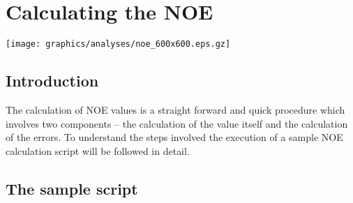 
\chapter{Calculating the NOE} \label{ch: NOE}


\begin{figure*}[h]
\texttt{[image: graphics/analyses/noe\_600x600.eps.gz]}
\end{figure*}



\section{Introduction}

The calculation of NOE values is a straight forward and quick procedure which involves two components -- the calculation of the value itself and the calculation of the errors.  To understand the steps involved the execution of a sample NOE calculation script will be followed in detail.




\section{The sample script}

